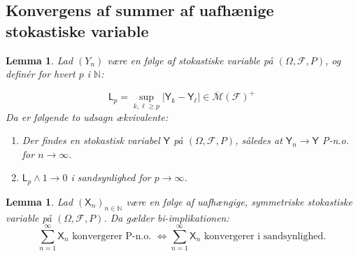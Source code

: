 \documentclass{article}
\newcommand{\1}{\mathbbm{1}}
\newcommand{\Y}{\mathsf{Y}}
\theoremstyle{boxed}
\newtheorem{lemma}[theorem]{Lemma}
\begin{document}
\subsection{Konvergens af summer af uafhænige stokastiske variable}
\begin{theorem-box}
    \begin{lemma}
        Lad $\left(Y_n\right)$ være en følge af stokastiske variable på $(\Omega, \mathcal{F}, P)$, og definér for hvert $p$ i $\mathbb{N}$:

$$
\mathsf{L}_p=\sup _{k, \ell \geq p}\left|\mathsf{Y}_k-\mathsf{Y}_{\ell}\right| \in \overline{\mathcal{M}}(\mathcal{F})^{+}
$$
Da er følgende to udsagn ækvivalente:
\begin{enumerate}
    \item[\textnormal{(i)}] Der findes en stokastisk variabel $\Y$ på $(\Omega, \mathcal{F}, P)$, således at $\mathsf{Y}_n \rightarrow \mathsf{Y}$ P-n.o. for $n \rightarrow \infty$.
    \item[\textnormal{(ii)}] $\mathsf{L}_p \wedge 1 \rightarrow 0$ i sandsynlighed for $p \rightarrow \infty$.
\end{enumerate}
    \end{lemma}
\end{theorem-box}
\begin{theorem-box}
    \begin{lemma}
        Lad $\left(\mathsf{X}_n\right)_{n \in \mathbb{N}}$ være en følge af uafhængige, symmetriske stokastiske variable på $(\Omega, \mathcal{F}, P)$. Da gælder bi-implikationen:
$$\sum_{n=1}^{\infty} \mathsf{X}_n \text{ konvergerer P-n.o. } \Longleftrightarrow \sum_{n=1}^{\infty} \mathsf{X}_n \text{ konvergerer i sandsynlighed.}$$
    \end{lemma}
\end{theorem-box}
\end{document}
